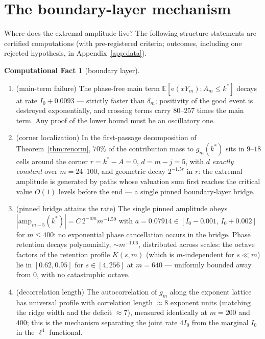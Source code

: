 \documentclass[11pt]{article}
\theoremstyle{definition}
\newtheorem{compfact}[theorem]{Computational Fact}
\newcommand{\E}{\mathbb{E}}
\newcommand{\e}{\mathrm{e}}
\begin{document}
\section{The boundary-layer mechanism}\label{sec:mech}

Where does the extremal amplitude live? The following structure
statements are certified computations (with pre-registered criteria;
outcomes, including one rejected hypothesis, in
Appendix~\ref{app:data}).

\begin{compfact}[boundary layer]\label{cf:mech}
\begin{enumerate}
\item[(a)] (main-term failure) The phase-free main term
  $\E[\e(xY_m);A_m\le k^*]$ decays at rate $I_0+0.0093$ --- strictly
  faster than $\delta_m$; positivity of the good event is destroyed
  exponentially, and crossing terms carry $80$--$257$ times the main
  term. Any proof of the lower bound must be an oscillatory one.
\item[(b)] (corner localization) In the first-passage decomposition of
  Theorem~\ref{thm:renorm}, $70\%$ of the contribution mass to
  $g_m(k^*)$ sits in $9$--$18$ cells around the corner
  $r=k^*-A=0$, $d=m-j=5$, with $d$ \emph{exactly constant} over
  $m=24$--$100$, and geometric decay $2^{-1.5r}$ in $r$: the extremal
  amplitude is generated by paths whose valuation sum first reaches the
  critical value $O(1)$ levels before the end --- a single pinned
  boundary-layer bridge.
\item[(c)] (pinned bridge attains the rate) The single pinned amplitude
  obeys $|\mathrm{amp}_{m-5}(k^*)|=C\,2^{-a m}m^{-1.59}$ with
  $a=0.07914\in[I_0-0.001,\,I_0+0.002]$ for $m\le 400$: no exponential
  phase cancellation occurs in the bridge. Phase retention decays
  polynomially, $\sim m^{-1.06}$, distributed across scales: the octave
  factors of the retention profile $K(s,m)$ (which is $m$-independent
  for $s\ll m$) lie in $[0.62,0.95]$ for $s\in[4,256]$ at $m=640$ ---
  uniformly bounded away from $0$, with no catastrophic octave.
\item[(d)] (decorrelation length) The autocorrelation of $g_m$ along the
  exponent lattice has universal profile with correlation length
  $\approx 8$ exponent units (matching the ridge width and the deficit
  $\approx 7$), measured identically at $m=200$ and $400$; this is the
  mechanism separating the joint rate $4I_0$ from the marginal $I_0$ in
  the $\ell^4$ functional.
\end{enumerate}
\end{compfact}
\end{document}
